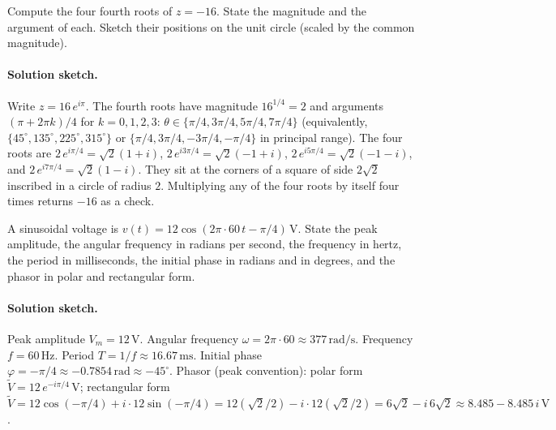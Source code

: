 \begin{exercise}
Compute the four fourth roots of $z = -16$. State the magnitude
and the argument of each. Sketch their positions on the unit
circle (scaled by the common magnitude).

\paragraph{Solution sketch.}
Write $z = 16\,e^{i\pi}$. The fourth roots have magnitude
$16^{1/4} = 2$ and arguments $(\pi + 2\pi k)/4$ for $k = 0, 1, 2, 3$:
$\theta \in \{\pi/4, 3\pi/4, 5\pi/4, 7\pi/4\}$ (equivalently,
$\{45^{\circ}, 135^{\circ}, 225^{\circ}, 315^{\circ}\}$ or
$\{\pi/4, 3\pi/4, -3\pi/4, -\pi/4\}$ in principal range). The four
roots are $2\,e^{i\pi/4} = \sqrt{2}(1 + i)$, $2\,e^{i 3\pi/4} =
\sqrt{2}(-1 + i)$, $2\,e^{i 5\pi/4} = \sqrt{2}(-1 - i)$, and
$2\,e^{i 7\pi/4} = \sqrt{2}(1 - i)$. They sit at the corners of
a square of side $2\sqrt{2}$ inscribed in a circle of radius
$2$. Multiplying any of the four roots by itself four times
returns $-16$ as a check.
\end{exercise}

\begin{exercise}
A sinusoidal voltage is $v(t) = 12\cos(2\pi \cdot 60 \,t -
\pi/4) \,\si{\volt}$. State the peak amplitude, the angular
frequency in radians per second, the frequency in hertz, the
period in milliseconds, the initial phase in radians and in
degrees, and the phasor in polar and rectangular form.

\paragraph{Solution sketch.}
Peak amplitude $V_{m} = 12\,\si{\volt}$. Angular frequency
$\omega = 2\pi \cdot 60 \approx 377\,\si{\radian\per\second}$.
Frequency $f = 60\,\si{\hertz}$. Period $T = 1/f \approx
16.67\,\si{\milli\second}$. Initial phase $\varphi = -\pi/4
\approx -0.7854\,\text{rad} \approx -45^{\circ}$. Phasor (peak
convention): polar form $\tilde V = 12\,e^{-i\pi/4}\,\si{\volt}$;
rectangular form $\tilde V = 12\cos(-\pi/4) + i \cdot 12\sin(-\pi/4)
= 12 (\sqrt{2}/2) - i \cdot 12 (\sqrt{2}/2) = 6\sqrt{2} -
i\,6\sqrt{2} \approx 8.485 - 8.485\,i \,\si{\volt}$.
\end{exercise}

